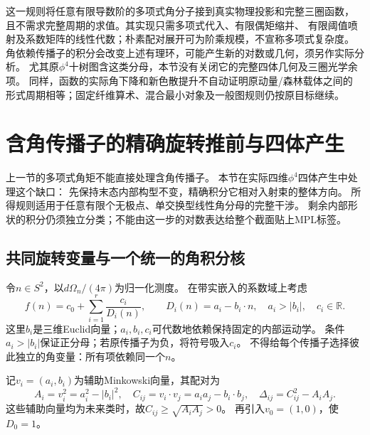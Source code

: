 \documentclass[11pt,a4paper]{ctexart}
\theoremstyle{cnplain}\newtheorem{theorem}{定理}[section]
\theoremstyle{definition}\newtheorem{definition}[theorem]{定义}
\theoremstyle{remark}\newtheorem{remark}[theorem]{注}
\begin{document}
这一规则将任意有限导数阶的多项式角分子接到真实物理投影和完整三圈函数，
且不需求完整周期的求值。其实现只需多项式代入、有限偶矩缩并、
有限阈值喷射及系数矩阵的线性代数；朴素配对展开可为阶乘规模，不宣称多项式复杂度。
角依赖传播子的积分会改变上述有理环，可能产生新的对数或几何，须另作实际分析。
尤其原$\phi^4$十树图含这类分母，本节没有关闭它的完整四体几何及三圈光学余项。
同样，函数的实际角下降和新色散提升不自动证明原动量/森林载体之间的
形式周期相等；固定纤维算术、混合最小对象及一般图规则仍按原目标继续。



\section{含角传播子的精确旋转推前与四体产生}\label{sec:rotationdenominators}
上一节的多项式角矩不能直接处理含角传播子。
本节在实际四维$\phi^4$四体产生中处理这个缺口：
先保持末态内部构型不变，精确积分它相对入射束的整体方向。
所得规则适用于任意有限个无极点、单交换型线性角分母的完整干涉。
剩余内部形状的积分仍须独立分类；不能由这一步的对数表达给整个截面贴上MPL标签。

\subsection{共同旋转变量与一个统一的角积分核}
令$n\in S^2$，以$d\Omega_n/(4\pi)$为归一化测度。
在带实嵌入的系数域上考虑
\[
 f(n)=c_0+\sum_{i=1}^r\frac{c_i}{D_i(n)},\qquad
 D_i(n)=a_i-b_i\cdot n,\quad a_i>|b_i|,\quad c_i\in\mathbb R.
 \tag{RA}\label{eq:rotationinput}
\]
这里$b_i$是三维Euclid向量；$a_i,b_i,c_i$可代数地依赖保持固定的内部运动学。
条件$a_i>|b_i|$保证正分母；若原传播子为负，将符号吸入$c_i$。
不得给每个传播子选择彼此独立的角变量：所有项依赖同一个$n$。

记$v_i=(a_i,b_i)$为辅助Minkowski向量，其配对为
\[
 A_i=v_i^2=a_i^2-|b_i|^2,\quad
 C_{ij}=v_i\cdot v_j=a_i a_j-b_i\cdot b_j,\quad
 \Delta_{ij}=C_{ij}^2-A_iA_j.
\]
这些辅助向量均为未来类时，故$C_{ij}\ge\sqrt{A_iA_j}>0$。
再引入$v_0=(1,0)$，使$D_0=1$。
\end{document}
